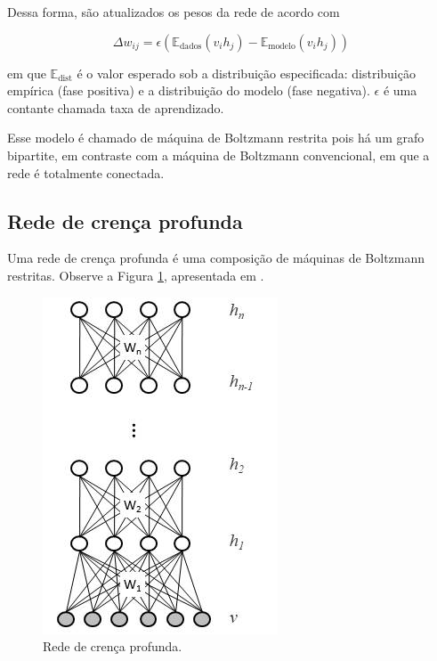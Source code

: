 \documentclass{article}
\begin{document}
            Dessa forma, são atualizados os pesos da rede de acordo com

            \begin{equation}
                \Delta w_{ij} = \epsilon(\mathbb{E}_{\textrm{dados}}(v_i h_j) - \mathbb{E}_{\textrm{modelo}}(v_i h_j))
            \end{equation}

            em que $\mathbb{E}_{\textrm{dist}}$ é o valor esperado sob a distribuição especificada: distribuição empírica (fase positiva) e a distribuição do modelo (fase negativa).
            $\epsilon$ é uma contante chamada taxa de aprendizado.
            
            Esse modelo é chamado de máquina de Boltzmann restrita pois há um grafo bipartite, em contraste com a máquina de Boltzmann convencional, em que a rede é totalmente conectada.

        \subsection{Rede de crença profunda}

            Uma rede de crença profunda é uma composição de máquinas de Boltzmann restritas. Observe a Figura \ref{fig4}, apresentada em \cite{testolin2018deep}.

            \begin{figure}[h!]
                \centering
                \includegraphics[scale=0.5]{Images/Deep belief network.png}
                \caption{Rede de crença profunda.}
                \label{fig4}
            \end{figure}
\end{document}
